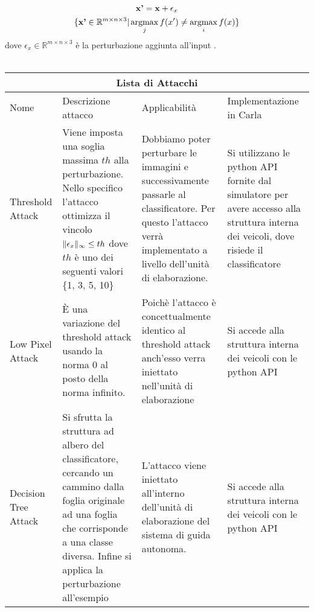  \begin{gather*}
 \noindent 	 \textbf{x'} = \textbf{x} + \epsilon_{x}\\
  \{ \textbf{x'} \in \mathbb{R}^{m \times n \times 3} |  \argmax_{j} f(x')\neq \argmax_{i} f(x)\}
 \end{gather*}
 dove $\epsilon_{x} \in \mathbb{R}^{m \times n \times 3}$ è la perturbazione aggiunta all'input \cite{thresh-lowpix}.\\\\

 
 

\noindent\begin{tabular}{|p{3cm}||p{3cm}|p{3cm}|p{3cm}|}
 \hline
 \multicolumn{4}{|c|}{Lista di Attacchi} \\
 \hline
 Nome     & Descrizione attacco & Applicabilità &Implementazione in Carla\\
 \hline
 Threshold Attack \cite{thresh-lowpix}
 
 &  Viene imposta una soglia massima $th$ alla perturbazione. Nello specifico l'attacco ottimizza  il vincolo $ \lVert\epsilon_{x}\rVert_{\infty} 	\leq th$ dove $th$ è uno dei seguenti valori \{1, 3, 5, 10\}
   
 
 & Dobbiamo poter perturbare le immagini e successivamente passarle al classificatore.  Per questo l'attacco verrà implementato a livello dell'unità di elaborazione.
 
 &Si utilizzano le python API fornite dal simulatore per avere accesso alla struttura interna dei veicoli, dove risiede il classificatore\\

 
 \hline
 
 Low Pixel Attack \cite{thresh-lowpix}
 &
 È una variazione del threshold attack usando la norma 0 al posto della norma infinito.
 
 & Poichè l'attacco è concettualmente identico al threshold attack anch'esso verra iniettato nell'unità di elaborazione
 
 &Si accede alla struttura interna dei veicoli con le python API\\
 \hline
 Decision Tree Attack \cite{decTree}
 
 &  Si sfrutta la struttura ad albero del classificatore,  cercando  un cammino dalla foglia originale ad una  foglia che corrisponde a una classe diversa.   Infine si applica la perturbazione all'esempio

& L'attacco viene iniettato all'interno dell'unità di elaborazione del sistema di guida autonoma.

& Si accede alla struttura interna dei veicoli con le python API \\
  \hline
\end{tabular}
